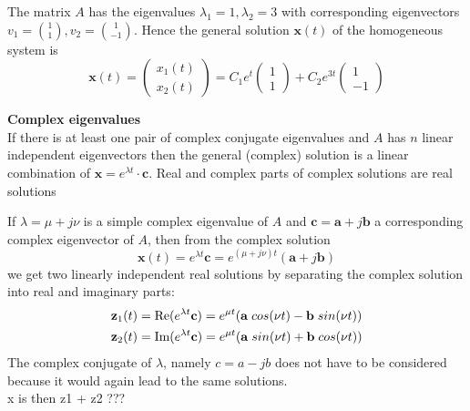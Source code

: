 The matrix $A$ has the eigenvalues $\lambda_1 = 1, \lambda_2 = 3$ with corresponding eigenvectors $v_1 = \binom{1}{1}, v_2 = \binom{1}{-1}$. Hence the general solution $\mathbf{x}(t)$ of the homogeneous system is
\begin{equation}
  \mathbf{x}(t) = \begin{pmatrix}
    x_1(t)\\
    x_2(t)
  \end{pmatrix} = C_1 e^t \begin{pmatrix} 1 \\ 1 \end{pmatrix} +
  C_2 e^{3t} \begin{pmatrix} 1 \\ -1 \end{pmatrix}
\end{equation}

\textbf{Complex eigenvalues}\\
If there is at least one pair of complex conjugate eigenvalues and $A$ has $n$ linear independent eigenvectors then the general (complex) solution is a linear combination of $\mathbf{x} = e^{\lambda t}\cdot \mathbf{c}$. Real and complex parts of complex solutions are real
solutions


If $\lambda = \mu + j\nu$ is a simple complex eigenvalue of $A$ and $\mathbf{c} = \mathbf{a} + j\mathbf{b}$ a corresponding complex eigenvector of $A$, then from the complex solution
\begin{equation}
  \mathbf{x}(t) = e^{\lambda t} \mathbf{c} = e^{(\mu + j\nu)t} (\mathbf{a} + j\mathbf{b})
\end{equation}
we get two linearly independent real solutions by separating the complex solution into real and imaginary parts:
\begin{equation}
  \begin{split}
    \mathbf{z}_1(t) &= \textup{Re}(e^{\lambda t} \mathbf{c}) = e^{\mu t}(\mathbf{a} \; cos(\nu t) - \mathbf{b} \; sin(\nu t))\\
    \mathbf{z}_2(t) &= \textup{Im}(e^{\lambda t} \mathbf{c}) = e^{\mu t}(\mathbf{a} \; sin(\nu t) + \mathbf{b} \; cos(\nu t))
  \end{split}
\end{equation}
The complex conjugate of $\lambda$, namely $c = a - jb$ does not have to be considered because it would again lead to the same solutions.\\
x is then z1 + z2 ???\\

